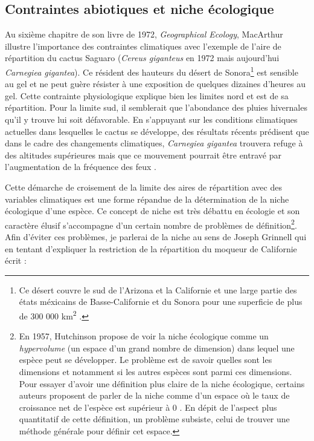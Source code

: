 \subsection*{Contraintes abiotiques et niche
écologique}\label{contraintes-abiotiques-et-niche-uxe9cologique}

Au sixième chapitre de son livre de 1972, \emph{Geographical Ecology},
MacArthur illustre l'importance des contraintes climatiques avec
l'exemple de l'aire de répartition du cactus Saguaro (\emph{Cereus
giganteus} en 1972 mais aujourd'hui \emph{Carnegiea gigantea}). Ce
résident des hauteurs du désert de Sonora\footnote{Ce désert couvre le
  sud de l'Arizona et la Californie et une large partie des états
  méxicains de Basse-Californie et du Sonora pour une superficie de plus
  de 300 000 km\textsuperscript{2} .} est sensible au gel et ne peut
guère résister à une exposition de quelques dizaines d'heures au gel.
Cette contrainte physiologique explique bien les limites nord et est de
sa répartition. Pour la limite sud, il semblerait que l'abondance des
pluies hivernales qu'il y trouve lui soit défavorable. En s'appuyant sur
les conditions climatiques actuelles dans lesquelles le cactus se
développe, des résultats récents prédisent que dans le cadre des
changements climatiques, \emph{Carnegiea gigantea} trouvera refuge à des
altitudes supérieures mais que ce mouvement pourrait être entravé par
l'augmentation de la fréquence des feux \citep{Springer2015}.

Cette démarche de croisement de la limite des aires de répartition avec
des variables climatiques est une forme répandue de la détermination de
la niche écologique d'une espèce. Ce concept de niche est très débattu
en écologie et son caractère élusif s'accompagne d'un certain nombre de
problèmes de définition\footnote{En 1957, Hutchinson propose de voir la
  niche écologique comme un \emph{hypervolume} (un espace d'un grand
  nombre de dimension) dans lequel une espèce peut se développer. Le
  problème est de savoir quelles sont les dimensions et notamment si les
  autres espèces sont parmi ces dimensions. Pour essayer d'avoir une
  définition plus claire de la niche écologique, certains auteurs
  proposent de parler de la niche comme d'un espace où le taux de
  croissance net de l'espèce est supérieur à 0 \citep{Chase2003}. En
  dépit de l'aspect plus quantitatif de cette définition, un problème
  subsiste, celui de trouver une méthode générale pour définir cet
  espace.}. Afin d'éviter ces problèmes, je parlerai de la niche au sens
de Joseph Grinnell qui en tentant d'expliquer la restriction de la
répartition du moqueur de Californie écrit :

